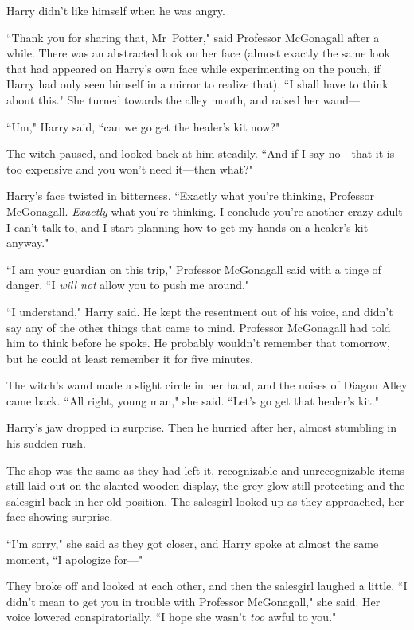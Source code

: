 Harry didn't like himself when he was angry.

``Thank you for sharing that, Mr~Potter," said Professor McGonagall after a while. There was an abstracted look on her face (almost exactly the same look that had appeared on Harry's own face while experimenting on the pouch, if Harry had only seen himself in a mirror to realize that). ``I shall have to think about this." She turned towards the alley mouth, and raised her wand—

``Um," Harry said, ``can we go get the healer's kit now?"

The witch paused, and looked back at him steadily. ``And if I say no—that it is too expensive and you won't need it—then what?"

Harry's face twisted in bitterness. ``Exactly what you're thinking, Professor McGonagall. \emph{Exactly} what you're thinking. I conclude you're another crazy adult I can't talk to, and I start planning how to get my hands on a healer's kit anyway."

``I am your guardian on this trip," Professor McGonagall said with a tinge of danger. ``I \emph{will not} allow you to push me around."

``I understand," Harry said. He kept the resentment out of his voice, and didn't say any of the other things that came to mind. Professor McGonagall had told him to think before he spoke. He probably wouldn't remember that tomorrow, but he could at least remember it for five minutes.

The witch's wand made a slight circle in her hand, and the noises of Diagon Alley came back. ``All right, young man," she said. ``Let's go get that healer's kit."

Harry's jaw dropped in surprise. Then he hurried after her, almost stumbling in his sudden rush.

\later

The shop was the same as they had left it, recognizable and unrecognizable items still laid out on the slanted wooden display, the grey glow still protecting and the salesgirl back in her old position. The salesgirl looked up as they approached, her face showing surprise.

``I'm sorry," she said as they got closer, and Harry spoke at almost the same moment, ``I apologize for—"

They broke off and looked at each other, and then the salesgirl laughed a little. ``I didn't mean to get you in trouble with Professor McGonagall," she said. Her voice lowered conspiratorially. ``I hope she wasn't \emph{too} awful to you."

